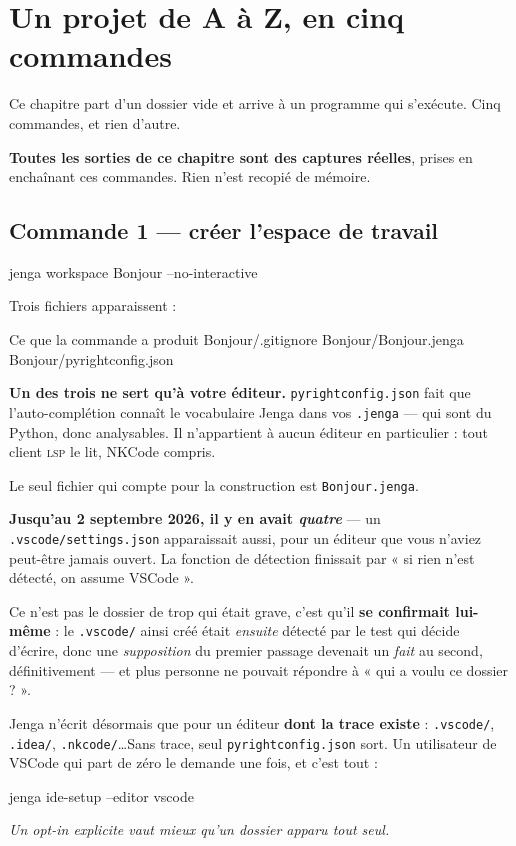 \chapter{Un projet de A à Z, en cinq commandes}
\label{ch:aaz}

Ce chapitre part d'un dossier vide et arrive à un programme qui s'exécute. Cinq
commandes, et rien d'autre.

\textbf{Toutes les sorties de ce chapitre sont des captures réelles}, prises en
enchaînant ces commandes. Rien n'est recopié de mémoire.

\section{Commande 1 --- créer l'espace de travail}

\begin{nkcode}{}
jenga workspace Bonjour --no-interactive
\end{nkcode}

Trois fichiers apparaissent :

\begin{nkcode}{Ce que la commande a produit}
Bonjour/.gitignore
Bonjour/Bonjour.jenga
Bonjour/pyrightconfig.json
\end{nkcode}

\begin{nkretenir}
\textbf{Un des trois ne sert qu'à votre éditeur.}
\texttt{pyrightconfig.json} fait que l'auto-complétion connaît le vocabulaire
Jenga dans vos \texttt{.jenga} --- qui sont du Python, donc analysables. Il
n'appartient à aucun éditeur en particulier : tout client \textsc{lsp} le lit,
NKCode compris.

Le seul fichier qui compte pour la construction est \texttt{Bonjour.jenga}.
\end{nkretenir}

\begin{nkpiege}
\textbf{Jusqu'au 2 septembre 2026, il y en avait \emph{quatre}} --- un
\texttt{.vscode/settings.json} apparaissait aussi, pour un éditeur que vous
n'aviez peut-être jamais ouvert. La fonction de détection finissait par
« si rien n'est détecté, on assume VSCode ».

Ce n'est pas le dossier de trop qui était grave, c'est qu'il \textbf{se
confirmait lui-même} : le \texttt{.vscode/} ainsi créé était \emph{ensuite}
détecté par le test qui décide d'écrire, donc une \emph{supposition} du premier
passage devenait un \emph{fait} au second, définitivement --- et plus personne
ne pouvait répondre à « qui a voulu ce dossier ? ».

Jenga n'écrit désormais que pour un éditeur \textbf{dont la trace existe} :
\texttt{.vscode/}, \texttt{.idea/}, \texttt{.nkcode/}\ldots Sans trace, seul
\texttt{pyrightconfig.json} sort. Un utilisateur de VSCode qui part de zéro le
demande une fois, et c'est tout :

\begin{nkcode}{}
jenga ide-setup --editor vscode
\end{nkcode}

\emph{Un opt-in explicite vaut mieux qu'un dossier apparu tout seul.}
\end{nkpiege}

